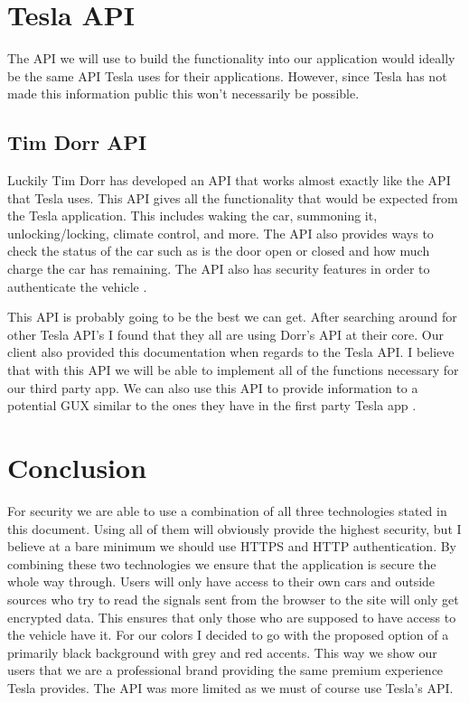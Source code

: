 \documentclass[draftclsnofoot, onecolumn, compsoc, 10pt]{IEEEtran}
\begin{document}
\section{Tesla API}
The API we will use to build the functionality into our application would ideally be the same API Tesla uses for their applications. However, since Tesla has not made this information public this won’t necessarily be possible.

\subsection{Tim Dorr API}
Luckily Tim Dorr has developed an API that works almost exactly like the API that Tesla uses. This API gives all the functionality that would be expected from the Tesla application. This includes waking the car, summoning it, unlocking/locking, climate control, and more. The API also provides ways to check the status of the car such as is the door open or closed and how much charge the car has remaining. The API also has security features in order to authenticate the vehicle \cite{API}. 

This API is probably going to be the best we can get. After searching around for other Tesla API’s I found that they all are using Dorr’s API at their core. Our client also provided this documentation when regards to the Tesla API. I believe that with this API we will be able to implement all of the functions necessary for our third party app. We can also use this API to provide information to a potential GUX similar to the ones they have in the first party Tesla app \cite{API}.
\section{Conclusion}
For security we are able to use a combination of all three technologies stated in this document. Using all of them will obviously provide the highest security, but I believe at a bare minimum we should use HTTPS and HTTP authentication. By combining these two technologies we ensure that the application is secure the whole way through. Users will only have access to their own cars and outside sources who try to read the signals sent from the browser to the site will only get encrypted data. This ensures that only those who are supposed to have access to the vehicle have it. For our colors I decided to go with the proposed option of a primarily black background with grey and red accents. This way we show our users that we are a professional brand providing the same premium experience Tesla provides. The API was more limited as we must of course use Tesla’s API. 
\newpage


\end{document}
